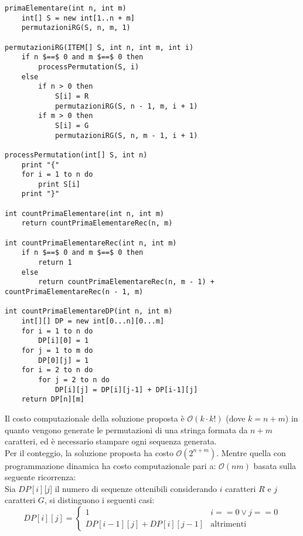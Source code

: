 \documentclass[../cheatSheetAlgoritmi.tex]{subfiles}
\begin{document}
\begin{lstlisting}[caption=Permutazioni dei caratteri G e R e conteggio]
primaElementare(int n, int m)
    int[] S = new int[1..n + m]
    permutazioniRG(S, n, m, 1)
        
permutazioniRG(ITEM[] S, int n, int m, int i)
    if n $==$ 0 and m $==$ 0 then
        processPermutation(S, i)
    else 
        if n > 0 then
            S[i] = R
            permutazioniRG(S, n - 1, m, i + 1)
        if m > 0 then
            S[i] = G
            permutazioniRG(S, n, m - 1, i + 1)
                
processPermutation(int[] S, int n) 
    print "{"
    for i = 1 to n do
        print S[i]
    print "}"
    
int countPrimaElementare(int n, int m)
    return countPrimaElementareRec(n, m)
        
int countPrimaElementareRec(int n, int m)
    if n $==$ 0 and m $==$ 0 then
        return 1
    else
        return countPrimaElementareRec(n, m - 1) + countPrimaElementareRec(n - 1, m)

int countPrimaElementareDP(int n, int m)
    int[][] DP = new int[0...n][0...m]
    for i = 1 to n do
        DP[i][0] = 1
    for j = 1 to m do
        DP[0][j] = 1
    for i = 2 to n do
        for j = 2 to n do
            DP[i][j] = DP[i][j-1] + DP[i-1][j]
    return DP[n][m]
\end{lstlisting}
Il costo computazionale della soluzione proposta è $\mathcal{O}(k \cdot k!)$ (dove $k = n + m$) in quanto vengono generate le permutazioni di una stringa formata da $n + m$ caratteri, ed è necessario stampare ogni sequenza generata. \\
Per il conteggio, la soluzione proposta ha costo $\mathcal{O}(2^{n + m})$. Mentre quella con programmazione dinamica ha costo computazionale pari a: $\mathcal{O}(nm)$ basata sulla seguente ricorrenza: \\
Sia $DP[i][j$] il numero di sequenze ottenibili considerando $i$ caratteri $R$ e $j$ caratteri $G$, si distinguono i seguenti casi:
\begin{equation*}
    DP[i][j]=\begin{cases}
        1 & \text{$i == 0 \lor j == 0$}\\
        DP[i-1][j] + DP[i][j-1] & \text{altrimenti} 
    \end{cases}
\end{equation*}
 
\end{document}
